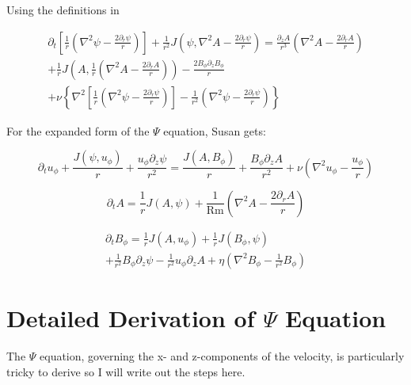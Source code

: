 \documentclass{paper}
\newcommand{\beq}{\begin{equation}}
\newcommand{\eeq}{\end{equation}}
\newcommand{\uphi}{\ensuremath{u_\phi}}
\newcommand\reym{\mathrm{Rm}}
\begin{document}
Using the definitions in 

\begin{multline}
  \label{eq:psi}
\partial_t \left[ \frac{1}{r} \left(\nabla^2 \psi - \frac{2 \partial_r \psi}{r} \right) \right] + \frac{1}{r^2} J(\psi, \nabla^2 A - \frac{2 \partial_r \psi}{r}) = \frac{\partial_z A}{r^3} \left( \nabla^2 A - \frac{2 \partial_r A}{r}\right) \\
+ \frac{1}{r} J\left(A,\frac{1}{r}\left( \nabla^2 A - \frac{2 \partial_r A}{r}\right)\right) - \frac{2 B_\phi \partial_z B_\phi}{r}\\
+ \nu \left\{ \nabla^2 \left[ \frac{1}{r} \left(\nabla^2 \psi - \frac{2 \partial_r \psi}{r}\right) \right]  -\frac{1}{r^2} \left(\nabla^2 \psi - \frac{2 \partial_r \psi}{r}\right) \right\}
\end{multline}

For the expanded form of the $\Psi$ equation, Susan gets:


\begin{equation}
  \label{eq:uy}
\partial_t \uphi + \frac{J(\psi, \uphi)}{r} + \frac{\uphi \partial_z \psi}{r^2} = \frac{J(A, B_\phi)}{r} + \frac{B_\phi \partial_z A}{r^2} + \nu \left( \nabla^2 \uphi - \frac{\uphi}{r}\right)
\end{equation}


\beq
 \label{eq:A}
\partial_t A = \frac{1}{r} J(A, \psi) + \frac{1}{\reym} \left( \nabla^2 A - \frac{2 \partial_r A}{r} \right)
\eeq

\begin{multline}
  \label{eq:By} %
\partial_t B_\phi = \frac{1}{r} J(A, \uphi) + \frac{1}{r} J(B_\phi, \psi)\\
+ \frac{1}{r^2} B_\phi \partial_z \psi - \frac{1}{r^2} \uphi \partial_z A + \eta \left(\nabla^2 B_\phi - \frac{1}{r^2} B_\phi \right)
\end{multline}

\section{Detailed Derivation of $\Psi$ Equation}
The $\Psi$ equation, governing the x- and z-components of the velocity, is particularly tricky to derive so I will write out the steps here.
\end{document}
